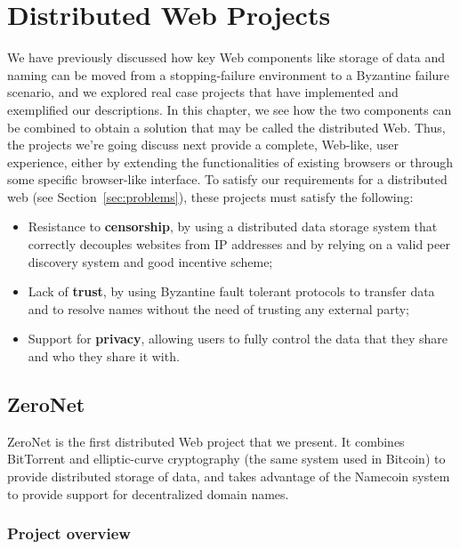 \documentclass[mscthesis]{usiinfthesis}
\begin{document}
\chapter{Distributed Web Projects}\label{ch:projects}

We have previously discussed how key Web components like storage of data and naming can be moved from a stopping-failure environment to a Byzantine failure scenario, and we explored real case projects that have implemented and exemplified our descriptions. In this chapter, we see how the two components can be combined to obtain a solution that may be called the distributed Web.
Thus, the projects we're going discuss next provide a complete, Web-like, user experience, either by extending the functionalities of existing browsers or through some specific browser-like interface.
To satisfy our requirements for a distributed web (see Section~\ref{sec:problems}), these projects must satisfy the following:
\begin{itemize}
	\item Resistance to \textbf{censorship}, by using a distributed data storage system that correctly decouples websites from IP addresses and by relying on a valid peer discovery system and good incentive scheme;
	\item Lack of \textbf{trust}, by using Byzantine fault tolerant protocols to transfer data and to resolve names without the need of trusting any external party;
	\item Support for \textbf{privacy}, allowing users to fully control the data that they share and who they share it with.
\end{itemize}

\section{ZeroNet}\label{proj:zeronet}

ZeroNet is the first distributed Web project that we present. It combines BitTorrent and elliptic-curve cryptography (the same system used in Bitcoin) to provide distributed storage of data, and takes advantage of the Namecoin system to provide support for decentralized domain names.

\subsection{Project overview}
\end{document}
